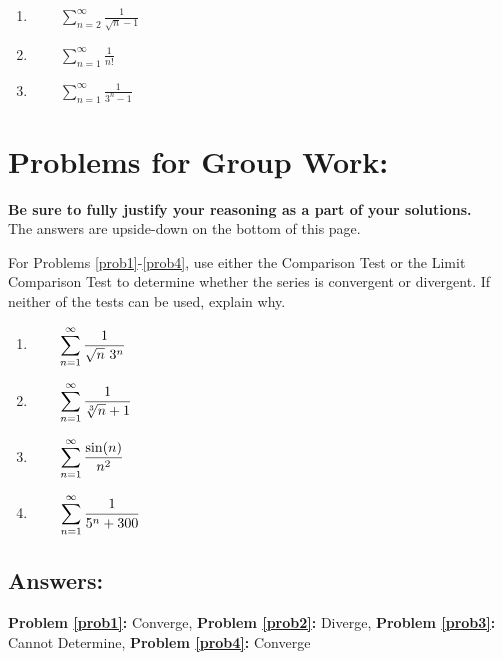 \documentclass[10pt]{article}
\begin{document}
\begin{enumerate}[{Example }1:]

\addtocounter{enumi}{1}


\item \(\qquad \sum_{n=2}^\infty \frac{1}{\sqrt{n}-1}\) \vfill

\item \(\qquad \sum_{n=1}^\infty \frac{1}{n!}\) \vfill

\item \(\qquad \sum_{n=1}^\infty \frac{1}{3^n-1}\) \vfill


\end{enumerate}

\section*{Problems for Group Work:}
\textbf{Be sure to fully justify your reasoning as a part of your solutions.}\\
 The answers are upside-down on the bottom of this page.

For Problems \ref{prob1}-\ref{prob4}, use either the Comparison Test or the Limit Comparison Test to determine whether the series is convergent or divergent. If neither of the tests can be used, explain why.

\begin{enumerate}[{Problem }1:]

\item \(\qquad \Sum \frac{1}{\sqrt{n}\ 3^n}\) \label{prob1}
\vfill

\item \(\qquad\displaystyle \sum_{n=1}^\infty \frac{1}{\sqrt[3]{n}+1}\) \label{prob2}
\vfill

\item \(\qquad\displaystyle \sum_{n=1}^\infty \frac{\sin(n)}{n^2}\) \label{prob3}
\vfill

\item \(\qquad\displaystyle \sum_{n=1}^\infty \frac{1}{5^n +300}\) \label{prob4}
\vfill

\end{enumerate}

\subsection*{Answers:}
\textbf{Problem \ref{prob1}:} Converge, 
\textbf{Problem \ref{prob2}:} Diverge, 
\textbf{Problem \ref{prob3}:} Cannot Determine, 
\textbf{Problem \ref{prob4}:} Converge\\

\end{document}
